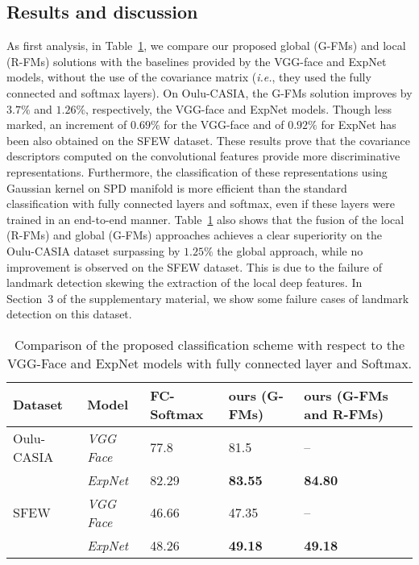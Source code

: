 \documentclass{bmvc2k}
\begin{document}
\subsection{Results and discussion}
As first analysis, in Table~\ref{tab:Accuracy}, we compare our proposed global (G-FMs) and local (R-FMs) solutions with the baselines provided by the VGG-face and ExpNet models, without the use of the covariance matrix (\textit{i.e.}, they used the fully connected and softmax layers).
On Oulu-CASIA, the G-FMs solution improves by $3.7\%$ and $1.26\%$, respectively, the VGG-face and ExpNet models.
Though less marked, an increment of $0.69\%$ for the VGG-face and of $0.92\%$ for ExpNet has been also obtained on the SFEW dataset. These results prove that the covariance descriptors computed on the convolutional features provide more discriminative representations. Furthermore, the classification of these representations using Gaussian kernel on SPD manifold is more efficient than the standard classification with fully connected layers and softmax, even if these layers were trained in an end-to-end manner.
Table~\ref{tab:Accuracy} also shows that the fusion of the local (R-FMs) and global (G-FMs) approaches achieves a clear superiority on the Oulu-CASIA dataset surpassing by $1.25\%$ the global approach, while no improvement is observed on the SFEW dataset. This is due to the failure of landmark detection skewing the extraction of the local deep features. In Section~3 of the supplementary material, we show some failure cases of landmark detection on this dataset. 

\setlength{\tabcolsep}{4pt}
\begin{table}[!ht]
\begin{center}
\small
\begin{tabular}{lllll}
\hline
\textbf{Dataset} & \textbf{Model} & \textbf{FC-Softmax} & \textbf{ours (G-FMs)} & \textbf{ours (G-FMs and R-FMs)} \\

\hline

Oulu-CASIA & \it VGG Face & 77.8 & 81.5 & -- \\
& \it ExpNet & 82.29 & \textbf{83.55} & \textbf{84.80} \\

\hline

SFEW &\it VGG Face & 46.66 & 47.35 & -- \\
& \it ExpNet & 48.26 & \textbf{49.18} & \textbf{49.18} \\
\hline
\end{tabular}
\end{center}
\caption{Comparison of the proposed classification scheme with respect to the VGG-Face and ExpNet models with fully connected layer and Softmax.}
\label{tab:Accuracy}
\end{table}
\setlength{\tabcolsep}{1.4pt}
\end{document}

